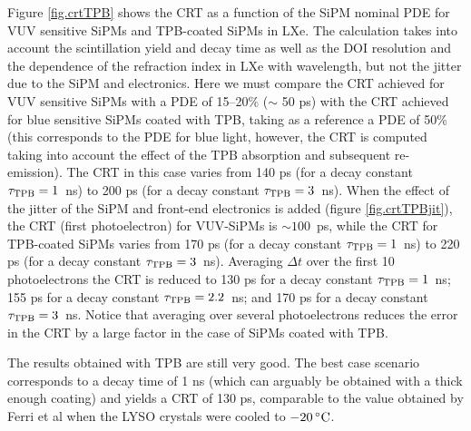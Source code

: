 \documentclass[11pt,a4paper]{article}
\begin{document}
Figure \ref{fig.crtTPB} shows the CRT as a function of the
 SiPM nominal PDE for VUV sensitive SiPMs and TPB-coated SiPMs in LXe. 
 The calculation takes into account the scintillation yield and decay time as well as the DOI resolution and the dependence of the refraction index in LXe with wavelength, but not the jitter due to the SiPM and electronics. 
 Here we must compare the CRT achieved for VUV sensitive SiPMs with a PDE of 15--20\% ($\sim$ 50 ps) with the CRT achieved for blue sensitive SiPMs coated with TPB, taking as a reference a PDE of 50\% (this corresponds to the
 PDE for blue light,  however, the CRT is computed taking into account the effect of the TPB absorption and subsequent re-emission).  The CRT in this case varies from 140 ps (for a decay constant $\tau_{\rm{TPB}} = 1$~ns) to 
 200 ps (for a decay constant $\tau_{\rm{TPB}} = 3$~ns).  When the effect of the jitter of the SiPM and front-end electronics is added (figure \ref{fig.crtTPBjit}), the CRT (first photoelectron) for VUV-SiPMs is $\sim 100$~ps, while the CRT for TPB-coated SiPMs varies from  170 ps (for a decay constant $\tau_{\rm{TPB}} = 1$~ns) to  220 ps (for a decay constant $\tau_{\rm{TPB}} = 3$~ns). Averaging $\Delta t$ over the first 10 photoelectrons  the CRT is reduced to 130 ps for a decay constant $\tau_{\rm{TPB}} = 1$~ns;  155 ps for a decay constant $\tau_{\rm{TPB}} = 2.2$~ns;  and 170 ps for a decay constant $\tau_{\rm{TPB}} = 3$~ns. Notice that averaging over several photoelectrons reduces the error in the CRT by a large factor in the case of SiPMs coated with TPB. 
 
 
 The results obtained with TPB are still very good. The best case scenario corresponds to a decay time of 1 ns
 (which can arguably be obtained with a thick enough coating) and yields a CRT of 130 ps, comparable to the value
 obtained by Ferri et al  \cite{LysoFBK}  when the LYSO crystals were cooled 
to $-20\,^{\circ}{\rm C}$.
    
\end{document}
